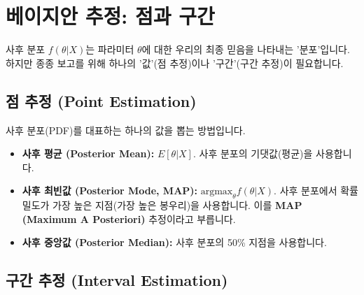 \documentclass[11pt,a4paper]{book}
\theoremstyle{definition}
\begin{document}
\section{베이지안 추정: 점과 구간}

사후 분포 $f(\theta | X)$는 파라미터 $\theta$에 대한 우리의 최종 믿음을 나타내는 '분포'입니다.
하지만 종종 보고를 위해 하나의 '값'(점 추정)이나 '구간'(구간 추정)이 필요합니다.

\subsection{점 추정 (Point Estimation)}

사후 분포(PDF)를 대표하는 하나의 값을 뽑는 방법입니다.

\begin{itemize}
    \item \textbf{사후 평균 (Posterior Mean):} $E[\theta | X]$. 사후 분포의 기댓값(평균)을 사용합니다.
    \item \textbf{사후 최빈값 (Posterior Mode, MAP):} $\text{argmax}_{\theta} f(\theta | X)$.
    사후 분포에서 확률 밀도가 가장 높은 지점(가장 높은 봉우리)을 사용합니다.
    이를 \textbf{MAP (Maximum A Posteriori)} 추정이라고 부릅니다.
    \item \textbf{사후 중앙값 (Posterior Median):} 사후 분포의 50\% 지점을 사용합니다.
\end{itemize}

\subsection{구간 추정 (Interval Estimation)}
\end{document}
